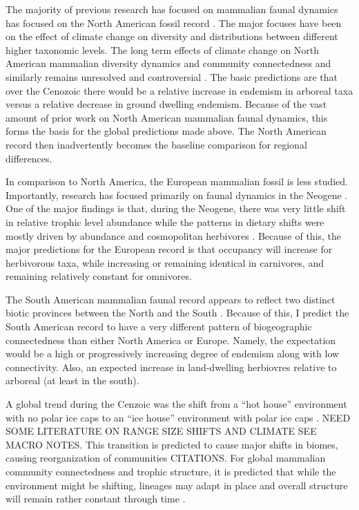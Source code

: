 \documentclass[12pt,letterpaper]{article}
\begin{document}
The majority of previous research has focused on mammalian faunal dynamics has focused on the North American fossil record \citep{Alroy2000g,Alroy1996a,Alroy1998,Barnosky2001a,Simpson1944,Simpson1953,Badgley2013,Blois2009,Figueirido2012,Gunnell1995,Hadly2001}. The major focuses have been on the effect of climate change on diversity and distributions between different higher taxonomic levels. The long term effects of climate change on North American mammalian diversity dynamics and community connectedness and similarly remains unresolved and controversial \citep{Alroy2000g,Blois2009,Figueirido2012,Barnosky2001a}. The basic predictions are that over the Cenozoic there would be a relative increase in endemism in arboreal taxa versus a relative decrease in ground dwelling endemism. Because of the vast amount of prior work on North American mammalian faunal dynamics, this forms the basis for the global predictions made above. The North American record then inadvertently becomes the baseline comparison for regional differences.

In comparison to North America, the European mammalian fossil is less studied. Importantly, research has focused primarily on faunal dynamics in the Neogene \citep{Jernvall2002,Jernvall2004,Liow2008,Raia2006,Raia2005,Raia2011c}. One of the major findings is that, during the Neogene, there was very little shift in relative trophic level abundance \citep{Jernvall2004} while the patterns in dietary shifts were mostly driven by abundance and cosmopolitan herbivores \citep{Jernvall2002}. Because of this, the major predictions for the European record is that occupancy will increase for herbivorous taxa, while increasing or remaining identical in carnivores, and remaining relatively constant for omnivores. 

The South American mammalian faunal record appears to reflect two distinct biotic provinces between the North and the South \citep{Macfadden1997,Macfadden2006,Flynn1998a,Patterson1968}. Because of this, I predict the South American record to have a very different pattern of biogeographic connectedness than either North America or Europe. Namely, the expectation would be a high or progressively increasing degree of endemism along with low connectivity. Also, an expected increase in land-dwelling herbiovres relative to arboreal (at least in the south).

A global trend during the Cenzoic was the shift from a ``hot house'' environment with no polar ice caps to an ``ice house'' environment with polar ice caps \citep{Zachos2008,Zachos2001}. NEED SOME LITERATURE ON RANGE SIZE SHIFTS AND CLIMATE SEE MACRO NOTES. This transition is predicted to cause major shifts in biomes, causing reorganization of communities CITATIONS. For global mammalian community connectedness and trophic structure, it is predicted that while the environment might be shifting, lineages may adapt in place and overall structure will remain rather constant through time \citep{Jernvall2004}.
\end{document}
